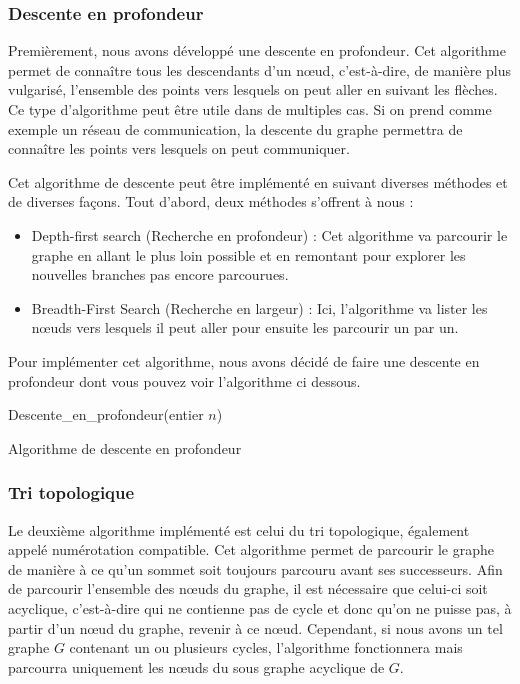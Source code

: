 \documentclass[11pt,a4paper]{article}
\begin{document}
			\subsubsection{Descente en profondeur}
				Premièrement, nous avons développé une descente en profondeur. Cet algorithme permet de connaître tous les descendants d'un n\oe ud, c'est-à-dire, de manière plus vulgarisé, l'ensemble des points vers lesquels on peut aller en suivant les flèches. Ce type d'algorithme peut être utile dans de multiples cas. Si on prend comme exemple un réseau de communication, la descente du graphe permettra de conna\^itre les points vers lesquels on peut communiquer.
				
				Cet algorithme de descente peut être implémenté en suivant diverses méthodes et de diverses façons. Tout d'abord, deux méthodes s'offrent à nous : 
				\begin{itemize}
					\item Depth-first search (Recherche en profondeur) : Cet algorithme va parcourir le graphe en allant le plus loin possible et en remontant pour explorer les nouvelles branches pas encore parcourues.
					\item Breadth-First Search (Recherche en largeur) : Ici, l'algorithme va lister les n\oe uds vers lesquels il peut aller pour ensuite les parcourir un par un.
				\end{itemize}
				Pour implémenter cet algorithme, nous avons décidé de faire une descente en profondeur dont vous pouvez voir l'algorithme ci dessous.
				
				\begin{algorithm}[htpb]
					Descente\_en\_profondeur(entier $n$)\\
					\caption{Algorithme de descente en profondeur}
				\end{algorithm}
				
			\subsubsection{Tri topologique}
				Le deuxième algorithme implémenté est celui du tri topologique, également appelé numérotation compatible. Cet algorithme permet de parcourir le graphe de manière à ce qu'un sommet soit toujours parcouru avant ses successeurs. Afin de parcourir l'ensemble des n\oe uds du graphe, il est nécessaire que celui-ci soit acyclique, c'est-à-dire qui ne contienne pas de cycle et donc qu'on ne puisse pas, à partir d'un n\oe ud du graphe, revenir à ce n\oe ud. Cependant, si nous avons un tel graphe $G$ contenant un ou plusieurs cycles, l'algorithme fonctionnera mais parcourra uniquement les n\oe uds du sous graphe acyclique de $G$.
				
\end{document}

